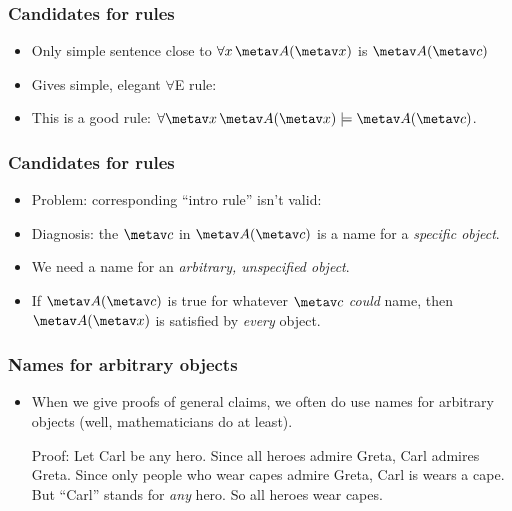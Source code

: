 \begin{frame}
\frametitle{Candidates for rules}

\begin{itemize}[<+->]
\item Only simple sentence close to $\forall x\, \metav A(\metav x)$ is
$\metav A(\metav c)$
\item Gives simple, elegant $\forall$E rule:

\begin{fitchproof}
\end{fitchproof}
\item This is a good rule: $\forall \metav x\,\metav A(\metav x)
\models \metav A(\metav c)$.
\end{itemize}
\end{frame}

\begin{frame}
  \frametitle{Candidates for rules}

\begin{itemize}[<+->]
\item Problem: corresponding ``intro rule'' isn't valid:
\begin{fitchproof}
\end{fitchproof}
\item Diagnosis: the $\metav c$ in $\metav A(\metav c)$ is a name for
a \emph{specific object}.
\item We need a name for an \emph{arbitrary,
unspecified object}.
\item If $\metav A(\metav c)$ is true for whatever $\metav c$
\emph{could} name, then $\metav A(\metav x)$ is satisfied by \emph{every} object.
\end{itemize}
\end{frame}

\begin{frame}
\frametitle{Names for arbitrary objects}

\begin{itemize}[<+->]
\item When we give proofs of general claims, we often do use names for
arbitrary objects (well, mathematicians do at least).

\pause
Proof: Let Carl be any hero.  Since all heroes admire Greta, Carl
admires Greta. Since only people who wear capes admire Greta, Carl is
wears a cape. But ``Carl'' stands for \emph{any} hero. So all heroes
wear capes.
\end{itemize}
\end{frame}


